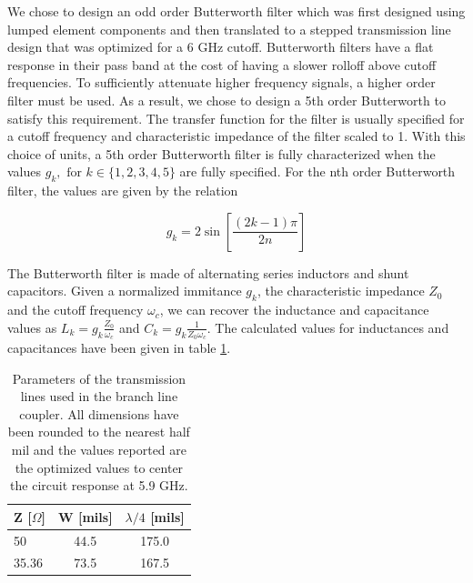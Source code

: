 \documentclass[twocolumn, aps, floatfix]{revtex4-1}
\begin{document}
We chose to design an odd order Butterworth filter which was first designed using lumped element components and then translated to a stepped transmission line design that was optimized for a 6 GHz cutoff. Butterworth filters have a flat response in their pass band at the cost of having a slower rolloff above cutoff frequencies. To sufficiently attenuate higher frequency signals, a higher order filter must be used. As a result, we chose to design a 5th order Butterworth to satisfy this requirement. The transfer function for the filter is usually specified for a cutoff frequency and characteristic impedance of the filter scaled to 1. With this choice of units, a 5th order Butterworth filter is fully characterized when the values $g_k, \textrm{ for } k \in \{1,2,3,4,5\}$ are fully specified. For the nth order Butterworth filter, the values are given by the relation

\begin{equation}
    g_k = 2 \sin \left[\frac{ (2 k - 1) \pi}{2 n} \right]
\end{equation}

The Butterworth filter is made of alternating series inductors and shunt capacitors. Given a normalized immitance $g_k$, the characteristic impedance $Z_0$ and the cutoff frequency $\omega_c$, we can recover the inductance and capacitance values as $L_k = g_k \frac{Z_0}{\omega_c}$ and $C_k = g_k \frac{1}{Z_0 \omega_c}$. The calculated values for inductances and capacitances have been given in table \ref{tab:parameters}.

\begin{table}
\centering
\begin{tabular}{l | c | c}
    \hline
    Z [$\Omega$] & W [mils] & $\lambda/4$ [mils] \\
    \hline
    50  & 44.5 & 175.0 \\
    35.36 & 73.5 & 167.5 \\
    \hline
\end{tabular}
    \caption{Parameters of the transmission lines used in the branch line coupler. All dimensions have been rounded to the nearest half mil and the values reported are the optimized values to center the circuit response at 5.9 GHz. }
    \label{tab:parameters}
\end{table}
\end{document}
